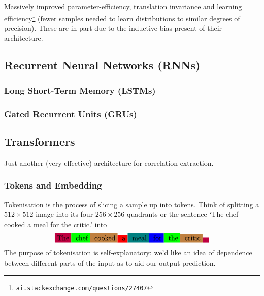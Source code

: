\documentclass[11pt]{article}
\begin{document}
\begin{tcolorbox}[title={\centering\textbf{Why use a CNN over an MLP?}}, colback=myLightBlue, colbacktitle=myDarkBlue, colframe=myDarkBlue, coltitle=white]
    Massively improved parameter-efficiency, translation invariance and learning efficiency\footnote{\href{https://ai.stackexchange.com/questions/27407/what-does-statistical-efficiency-mean-in-this-context}{\texttt{ai.stackexchange.com/questions/27407}}} (fewer samples needed to learn distributions to similar degrees of precision). These are in part due to the inductive bias present of their architecture.
\end{tcolorbox}

\subsection{\TODO{: }Recurrent Neural Networks (RNNs)}

\subsubsection{Long Short-Term Memory (LSTMs)}

\subsubsection{Gated Recurrent Units (GRUs)}

\subsection{\TODO{: }Transformers}
Just another (very effective) architecture for correlation extraction.

\subsubsection{Tokens and Embedding}
Tokenisation is the process of slicing a sample up into tokens. Think of splitting a $512\times512$ image into its four $256\times256$ quadrants or the sentence `The chef cooked a meal for the critic.' into
$$
\colorbox{purple}{The}\colorbox{green}{ chef}\colorbox{brown}{ cooked}\colorbox{red}{ a}\colorbox{teal}{ meal}\colorbox{blue}{ for}\colorbox{green}{ the}\colorbox{brown}{ critic}\colorbox{purple}{.}
$$
The purpose of tokenisation is self-explanatory: we'd like an idea of dependence between different parts of the input as to aid our output prediction.
\end{document}
